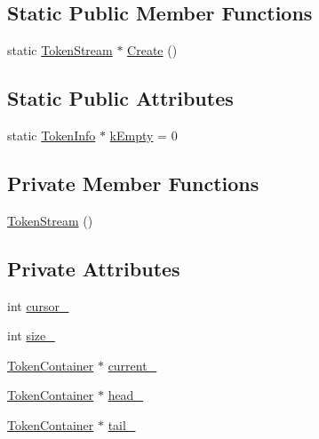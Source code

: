 \subsection*{Static Public Member Functions}
\begin{DoxyCompactItemize}
\item 
static \hyperlink{classmocha_1_1_token_stream}{TokenStream} $\ast$ \hyperlink{classmocha_1_1_token_stream_ad50a516f8313419dbc01f4f494f86b32}{Create} ()
\end{DoxyCompactItemize}
\subsection*{Static Public Attributes}
\begin{DoxyCompactItemize}
\item 
static \hyperlink{classmocha_1_1_token_info}{TokenInfo} $\ast$ \hyperlink{classmocha_1_1_token_stream_ae15de3402e95397fd58b6efa49f08d42}{kEmpty} = 0
\end{DoxyCompactItemize}
\subsection*{Private Member Functions}
\begin{DoxyCompactItemize}
\item 
\hyperlink{classmocha_1_1_token_stream_a4ad4aad5e1d4449430ad4225e374cfbe}{TokenStream} ()
\end{DoxyCompactItemize}
\subsection*{Private Attributes}
\begin{DoxyCompactItemize}
\item 
int \hyperlink{classmocha_1_1_token_stream_acb7ac8cb2bdc97c495621b92139a5d47}{cursor\_\-}
\item 
int \hyperlink{classmocha_1_1_token_stream_a0a7f30870a65e8bc87cb435ca366ea52}{size\_\-}
\item 
\hyperlink{classmocha_1_1_token_container}{TokenContainer} $\ast$ \hyperlink{classmocha_1_1_token_stream_a91a912c01f3ca9489c7f29e49a436324}{current\_\-}
\item 
\hyperlink{classmocha_1_1_token_container}{TokenContainer} $\ast$ \hyperlink{classmocha_1_1_token_stream_a931a79234762ef220bc3e887a0426721}{head\_\-}
\item 
\hyperlink{classmocha_1_1_token_container}{TokenContainer} $\ast$ \hyperlink{classmocha_1_1_token_stream_a478d6cb07f735082f7cf55a86d6addc2}{tail\_\-}
\end{DoxyCompactItemize}


